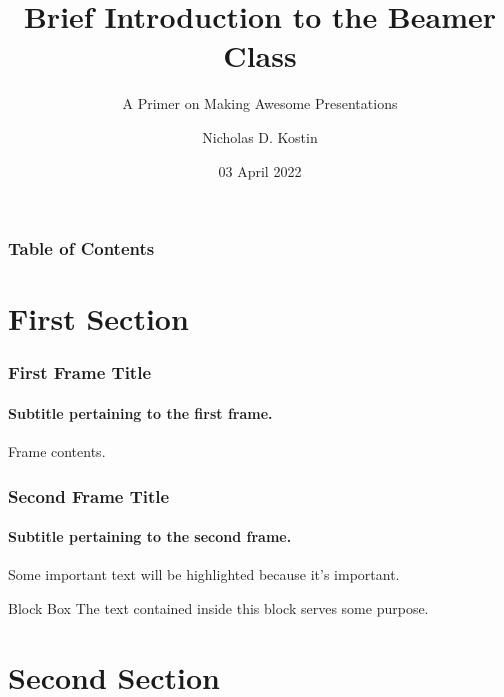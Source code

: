 \documentclass[aspectratio=169]{beamer}
\title{Brief Introduction to the Beamer Class}
\subtitle{A Primer on Making Awesome Presentations}
\author{Nicholas D. Kostin}
\date{03 April 2022}
\begin{document}
\frame{\titlepage}

\begin{frame}
    \frametitle{Table of Contents}
    \tableofcontents
\end{frame}

\section{First Section}

\begin{frame}
\frametitle{First Frame Title}
\framesubtitle{Subtitle pertaining to the first frame.}

Frame contents.

\end{frame}

\begin{frame}
\frametitle{Second Frame Title}
\framesubtitle{Subtitle pertaining to the second frame.}

Some important text will be \alert{highlighted} because it's important.

\vfill

\begin{block}{Block Box}
    The text contained inside this block serves some purpose.
\end{block}

\end{frame}

\section{Second Section}
\end{document}
